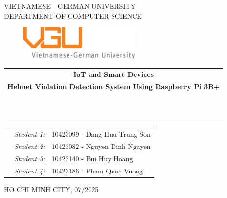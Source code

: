 \documentclass[11pt]{report}
\theoremstyle{mytheor}
\begin{document}
\begin{titlepage}
\begin{center}
VIETNAMESE - GERMAN UNIVERSITY \\
DEPARTMENT OF COMPUTER SCIENCE
\end{center}

\vspace{1cm}

\begin{figure}[h!]
\begin{center}
\includegraphics[width=6cm]{assets/vgu_logo_large.png}
\end{center}
\end{figure}

\vspace{2cm}

\begin{center}
\begin{tabular}{c}
\multicolumn{1}{c}{\textbf{{\Large IoT and Smart Devices}}} \\ 
\multicolumn{1}{c}{\textbf{{\Large Helmet Violation Detection System Using Raspberry Pi 3B+}}} \\

~~\\

\\
\multicolumn{1}{l}{\textbf{{\Large}}}\\
\\
\textbf{{\Large}}\\

\\
\\

\end{tabular}
\end{center}

\vspace{3cm}

\begin{table}[h]
\begin{tabular}{rrl}
\hspace{5.1cm} 
&\textit{Student 1: } & 10423099 - Dang Huu Trung Son \\
&\textit{Student 2: } & 10423082 - Nguyen Dinh Nguyen \\
&\textit{Student 3: } & 10423140 - Bui Huy Hoang \\
&\textit{Student 4: } & 10423186 - Pham Quoc Vuong \\
\end{tabular}
\end{table}

\vspace{3cm}

\begin{center}
{\footnotesize HO CHI MINH CITY, 07/2025}
\end{center}

\end{titlepage}
\end{document}
